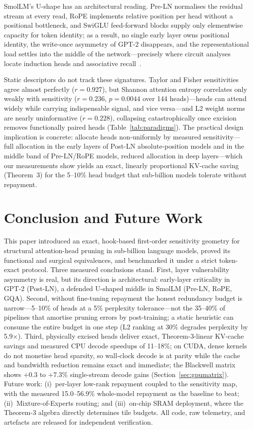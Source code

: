 \documentclass[11pt]{article}
\begin{document}
SmolLM's U-shape has an architectural reading. Pre-LN normalises the residual
stream at every read, RoPE implements relative position per head without a
positional bottleneck, and SwiGLU feed-forward blocks supply only
elementwise capacity for token identity; as a result, no single early layer owns
positional identity, the write-once asymmetry of GPT-2 disappears, and the
representational load settles into the middle of the network---precisely where
circuit analyses locate induction heads and associative recall~\cite{elhage2021mathematical,
olsson2022context}.

Static descriptors do not track these signatures. Taylor and Fisher sensitivities
agree almost perfectly ($r=0.927$), but Shannon attention entropy correlates only
weakly with sensitivity ($r=0.236$, $p=0.0044$ over 144 heads)---heads can attend
widely while carrying indispensable signal, and vice versa---and L2 weight norms
are nearly uninformative ($r=0.228$), collapsing catastrophically once excision
removes functionally paired heads (Table~\ref{tab:paradigms}). The practical
design implication is concrete: allocate heads non-uniformly by measured
sensitivity---full allocation in the early layers of Post-LN absolute-position
models and in the middle band of Pre-LN/RoPE models, reduced allocation in deep
layers---which our measurements show yields an exact, linearly proportional
KV-cache saving (Theorem~3) for the 5--10\% head budget that sub-billion models
tolerate without repayment.

\section{Conclusion and Future Work}
This paper introduced an exact, hook-based first-order sensitivity geometry for
structural attention-head pruning in sub-billion language models, proved its
functional and surgical equivalences, and benchmarked it under a strict
token-exact protocol. Three measured conclusions stand. First, layer vulnerability asymmetry is real, but its direction is
architectural: early-layer criticality in GPT-2 (Post-LN), a defended U-shaped
middle in SmolLM (Pre-LN, RoPE, GQA). Second, without fine-tuning repayment the
honest redundancy budget is narrow---5--10\% of heads at a 5\% perplexity
tolerance---not the 35--40\% of pipelines that amortise pruning errors by
post-training; a static heuristic can consume the entire budget in one step
(L2 ranking at 30\% degrades perplexity by 5.9$\times$). Third,
physically excised heads deliver exact, Theorem-3-linear KV-cache savings and
measured CPU decode speedups of 11--18\%; on CUDA, dense kernels do not
monetise head sparsity, so wall-clock decode is at parity while the cache and
bandwidth reduction remains exact and immediate; the Blackwell matrix shows
$+0.3$ to $+7.3\%$ single-stream decode gains (Section~\ref{sec:gpumatrix}).
Future work: (i)~per-layer low-rank repayment coupled to the sensitivity map,
with the measured 15.0--56.9\% whole-model repayment as the baseline to beat;
(ii)~Mixture-of-Experts routing; and (iii)~on-chip SRAM deployment, where the
Theorem-3 algebra directly determines tile budgets. All code, raw telemetry,
and artefacts are released for independent verification.
\end{document}
